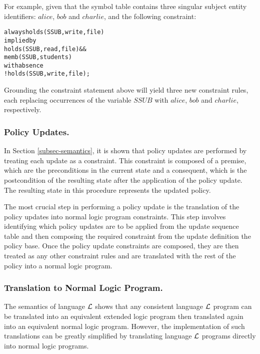 \documentclass[global,twocolumn,final]{svjour}
\newenvironment{vverbatim}
  {\begin{alltt}}
  {\vspace{-\baselineskip}\end{alltt}}
\begin{document}
        For example, given that the symbol table contains three singular
        subject entity identifiers: $alice$, $bob$ and $charlie$, and the
        following constraint:

        \begin{vverbatim}
  always holds(SSUB, write, file)
    implied by
      holds(SSUB, read, file) &&
      memb(SSUB, students)
    with absence
      !holds(SSUB, write, file);
        \end{vverbatim}

        Grounding the constraint statement above will yield three new
        constraint rules, each replacing occurrences of the variable $SSUB$
        with $alice$, $bob$ and $charlie$, respectively.

      \subsubsection{Policy Updates.}

        In Section \ref{subsec-semantics}, it is shown that policy updates are
        performed by treating each update as a constraint. This constraint is
        composed of a premise, which are the preconditions in the current state
        and a consequent, which is the postcondition of the resulting state
        after the application of the policy update. The resulting state in this
        procedure represents the updated policy.

        The most crucial step in performing a policy update is the translation
        of the policy updates into normal logic program constraints. This step
        involves identifying which policy updates are to be applied from the
        update sequence table and then composing the required constraint from
        the update definition the policy base. Once the policy update
        constraints are composed, they are then treated as any other
        constraint rules and are translated with the rest of the policy into
        a normal logic program.

      \subsubsection{Translation to Normal Logic Program.}

        The semantics of language ${\cal L}$ shows that any consistent language
        ${\cal L}$ program can be translated into an equivalent extended logic
        program then translated again into an equivalent normal logic program.
        However, the implementation of such translations can be greatly
        simplified by translating language ${\cal L}$ programs directly into
        normal logic programs.
\end{document}
